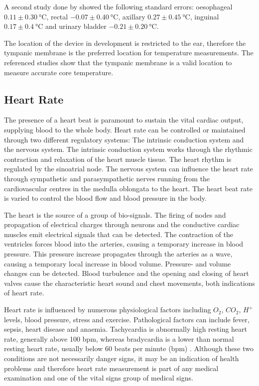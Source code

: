 \medskip
A second study done by \cite{lefrant2003temperature} showed the following standard errors: oesophageal  $0.11 \pm \SI{0.30}{\celsius}$, rectal $-0.07 \pm \SI{0.40}{\celsius}$, axillary $0.27\pm \SI{0.45}{\celsius}$, inguinal $0.17 \pm \SI{0.4}{\celsius}$ and urinary bladder $-0.21 \pm \SI{0.20}{\celsius}$.

\medskip
The location of the device in development is restricted to the ear, therefore the tympanic membrane is the preferred location for temperature measurements. The referenced studies show that the tympanic membrane is a valid location to measure accurate core temperature.

\subsection{Heart Rate}
The presence of a heart beat is paramount to sustain the vital cardiac output, supplying blood to the whole body. Heart rate can be controlled or maintained through two different regulatory systems: The intrinsic conduction system and the nervous system. The intrinsic conduction system works through the rhythmic contraction and relaxation of the heart muscle tissue. The heart rhythm is regulated by the sinoatrial node. The nervous system can influence the heart rate through sympathetic and parasympathetic nerves running from the cardiovascular centres in the medulla oblongata to the heart. The heart beat rate is varied to control the blood flow and blood pressure in the body.

\medskip
The heart is the source of a group of bio-signals. The firing of nodes and propagation of electrical charges through neurons and the conductive cardiac muscles emit electrical signals that can be detected. The contraction of the  ventricles forces blood into the arteries, causing a temporary increase in blood pressure. This pressure increase propagates through the arteries as a wave, causing a temporary local increase in blood volume. Pressure- and volume changes can be detected. Blood turbulence and the opening and closing of heart valves cause the characteristic heart sound and chest movements, both indications of heart rate.

\medskip
Heart rate is influenced by numerous physiological factors including $O_2$, $CO_2$, $H^+$ levels, blood pressure, stress and exercise. Pathological factors can include fever, sepsis, heart disease and anaemia. Tachycardia is abnormally high resting heart rate, generally above 100 bpm, whereas bradycardia is a lower than normal resting heart rate, usually below 60 beats per minute (bpm) \citep{normalRestingHR}. Although these two conditions are not necessarily danger signs, it may be an indication of health problems and therefore heart rate measurement is part of any medical examination and one of the vital signs group of medical signs.

